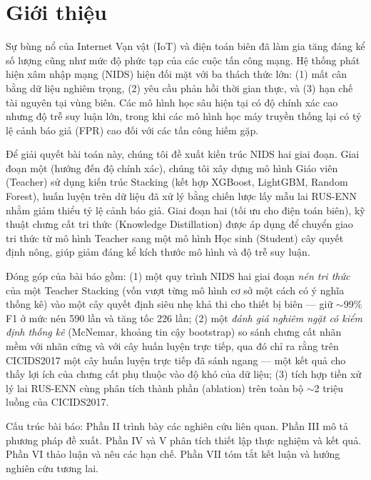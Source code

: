 \section{Giới thiệu}
Sự bùng nổ của Internet Vạn vật (IoT) và điện toán biên đã làm gia tăng đáng kể số lượng cũng như mức độ phức tạp của các cuộc tấn công mạng. Hệ thống phát hiện xâm nhập mạng (NIDS) hiện đối mặt với ba thách thức lớn: (1) mất cân bằng dữ liệu nghiêm trọng, (2) yêu cầu phản hồi thời gian thực, và (3) hạn chế tài nguyên tại vùng biên. Các mô hình học sâu hiện tại có độ chính xác cao nhưng độ trễ suy luận lớn, trong khi các mô hình học máy truyền thống lại có tỷ lệ cảnh báo giả (FPR) cao đối với các tấn công hiếm gặp.

Để giải quyết bài toán này, chúng tôi đề xuất kiến trúc NIDS hai giai đoạn. Giai đoạn một (hướng đến độ chính xác), chúng tôi xây dựng mô hình Giáo viên (Teacher) sử dụng kiến trúc Stacking (kết hợp XGBoost, LightGBM, Random Forest), huấn luyện trên dữ liệu đã xử lý bằng chiến lược lấy mẫu lai RUS-ENN nhằm giảm thiểu tỷ lệ cảnh báo giả. Giai đoạn hai (tối ưu cho điện toán biên), kỹ thuật chưng cất tri thức (Knowledge Distillation) được áp dụng để chuyển giao tri thức từ mô hình Teacher sang một mô hình Học sinh (Student) cây quyết định nông, giúp giảm đáng kể kích thước mô hình và độ trễ suy luận.

Đóng góp của bài báo gồm: (1) một quy trình NIDS hai giai đoạn \emph{nén tri thức} của một Teacher Stacking (vốn vượt từng mô hình cơ sở một cách có ý nghĩa thống kê) vào một cây quyết định siêu nhẹ khả thi cho thiết bị biên --- giữ $\sim$99\% F1 ở mức nén 590 lần và tăng tốc 226 lần; (2) một \emph{đánh giá nghiêm ngặt có kiểm định thống kê} (McNemar, khoảng tin cậy bootstrap) so sánh chưng cất nhãn mềm với nhãn cứng và với cây huấn luyện trực tiếp, qua đó chỉ ra rằng trên CICIDS2017 một cây huấn luyện trực tiếp đã sánh ngang --- một kết quả cho thấy lợi ích của chưng cất phụ thuộc vào độ khó của dữ liệu; (3) tích hợp tiền xử lý lai RUS-ENN cùng phân tích thành phần (ablation) trên toàn bộ $\sim$2 triệu luồng của CICIDS2017.

Cấu trúc bài báo: Phần II trình bày các nghiên cứu liên quan. Phần III mô tả phương pháp đề xuất. Phần IV và V phân tích thiết lập thực nghiệm và kết quả. Phần VI thảo luận và nêu các hạn chế. Phần VII tóm tắt kết luận và hướng nghiên cứu tương lai.
